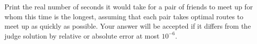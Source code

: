 
Print the real number of seconds it would take for a pair of friends to meet up for whom this time is the longest, assuming that each pair takes optimal routes to meet up as quickly as possible. Your answer will be accepted if it differs from the judge solution by relative or absolute error at most $10^{-6}$.
